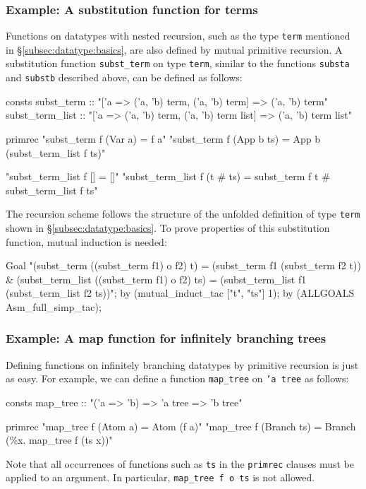 \subsubsection{Example: A substitution function for terms}
Functions on datatypes with nested recursion, such as the type
\texttt{term} mentioned in {\S}\ref{subsec:datatype:basics}, are
also defined by mutual primitive recursion. A substitution
function \texttt{subst_term} on type \texttt{term}, similar to the functions
\texttt{substa} and \texttt{substb} described above, can
be defined as follows:
\begin{ttbox}
consts
  subst_term :: "['a => ('a, 'b) term, ('a, 'b) term] => ('a, 'b) term"
  subst_term_list ::
    "['a => ('a, 'b) term, ('a, 'b) term list] => ('a, 'b) term list"

primrec
  "subst_term f (Var a) = f a"
  "subst_term f (App b ts) = App b (subst_term_list f ts)"

  "subst_term_list f [] = []"
  "subst_term_list f (t # ts) =
     subst_term f t # subst_term_list f ts"
\end{ttbox}
The recursion scheme follows the structure of the unfolded definition of type
\texttt{term} shown in {\S}\ref{subsec:datatype:basics}. To prove properties of
this substitution function, mutual induction is needed:
\begin{ttbox}
Goal
  "(subst_term ((subst_term f1) o f2) t) =
     (subst_term f1 (subst_term f2 t)) &
   (subst_term_list ((subst_term f1) o f2) ts) =
     (subst_term_list f1 (subst_term_list f2 ts))";
by (mutual_induct_tac ["t", "ts"] 1);
by (ALLGOALS Asm_full_simp_tac);
\end{ttbox}

\subsubsection{Example: A map function for infinitely branching trees}
Defining functions on infinitely branching datatypes by primitive
recursion is just as easy. For example, we can define a function
\texttt{map_tree} on \texttt{'a tree} as follows:
\begin{ttbox}
consts
  map_tree :: "('a => 'b) => 'a tree => 'b tree"

primrec
  "map_tree f (Atom a) = Atom (f a)"
  "map_tree f (Branch ts) = Branch (\%x. map_tree f (ts x))"
\end{ttbox}
Note that all occurrences of functions such as \texttt{ts} in the
\texttt{primrec} clauses must be applied to an argument. In particular,
\texttt{map_tree f o ts} is not allowed.

